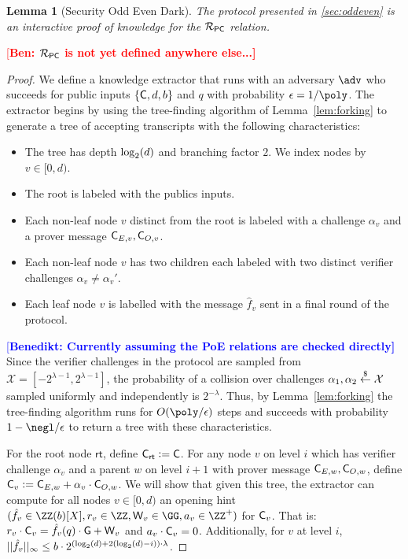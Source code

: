 \documentclass[12pt]{article}
\theoremstyle{Definition}
\newtheorem{lemma}{Lemma}
\newcommand{\ben}[1]{{\textcolor{red}{[\bf Ben: #1]}}}
\newcommand{\benedikt}[1]{{\textcolor{blue}{[\bf Benedikt: #1]}}}
\newcommand{\ben}[1]{}
\begin{document}
	
\begin{lemma}[Security Odd Even Dark]
	The protocol presented in \cref{sec:oddeven} is an interactive proof of knowledge for the $\mathcal{R}_{\mathsf{PC}}$ relation.
\end{lemma}
\ben{$\mathcal{R}_{\mathsf{PC}}$ is not yet defined anywhere else...}
\begin{proof}
		We define a knowledge extractor that runs with an adversary $\adv$ who succeeds for public inputs $\{\mathsf{C},d,b \}$ and $q$ with probability $\epsilon = 1/\poly$. The extractor begins by using the tree-finding algorithm of Lemma~\ref{lem:forking} to generate a tree of accepting transcripts with the following characteristics: 
\begin{itemize}
\item The tree has depth $\log_2(d)$ and branching factor $2$. We index nodes by $v \in [0, d)$.
\item The root is labeled with the publics inputs. 
\item Each non-leaf node $v$ distinct from the root is labeled with a challenge $\alpha_{v}$ and a prover message $\mathsf{C}_{E,v},\mathsf{C}_{O,v}$.
\item Each non-leaf node $v$ has two children each labeled with two distinct verifier challenges 
$\alpha_{v} \neq \alpha_{v}'$.
\item Each leaf node $v$ is labelled with the message $\hat{f}_v$ sent in a final round of the protocol. 


\end{itemize} 
\benedikt{Currently assuming the PoE relations are checked directly}
Since the verifier challenges in the protocol are sampled from $\mathcal{X} = [-2^{\lambda -1}, 2^{\lambda -1}]$, the probability of a collision over challenges $\alpha_1, \alpha_2 \overset{\$}{\gets} \mathcal{X}$ sampled uniformly and independently is $2^{-\lambda}$. Thus, by Lemma~\ref{lem:forking} the tree-finding algorithm runs for $O(\poly/\epsilon)$ steps and succeeds with probability $1 - \negl/\epsilon$ to return a tree with these characteristics.

For the root node $\textsf{rt}$, define $\mathsf{C}_\textsf{rt} \mathrel{\mathop:}= \mathsf{C}$. For any node $v$ on level $i$ which has verifier challenge $\alpha_v$ and a parent $w$ on level $i+1$ with prover message $\mathsf{C}_{E,w},\mathsf{C}_{O,w}$, define $\mathsf{C}_v \mathrel{\mathop:}= \mathsf{C}_{E,w} + \alpha_v \cdot \mathsf{C}_{O,w}$.
We will show that given this tree, the extractor can compute for all nodes $v \in [0, d)$ an opening hint $(\hat{f}_v \in \ZZ(b)[X],\denom_v \in \ZZ,\gr{W}_v \in \GG,a_v \in \ZZ^+)$ for $\mathsf{C}_v$. That is: $r_v \cdot \mathsf{C}_v=\hat{f}_v(q) \cdot \mathsf{G} +\mathsf{W}_v$ and $a_v \cdot \mathsf{C}_v=0$. Additionally, for $v$ at level $i$, $||\hat{f}_v||_\infty \leq b\cdot 2^{(\log_2(d)+2(\log_2(d)-i)) \cdot \lambda}$.


\end{proof}
\end{document}
